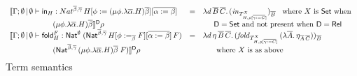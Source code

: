 \documentclass[runningheads]{llncs}
\newcommand{\set}{\mathsf{Set}}
\newcommand{\fold}{\mathsf{fold}}
\begin{document}
\begin{figure}[t]
\begin{adjustbox}{varwidth=6in, max width=5.3in, fbox, center}
\[\begin{array}{lll}
\llbracket \Gamma;\emptyset \,|\, \emptyset \vdash \tin_H :
Nat^{\ol{\beta},\ol{\gamma}} \, H[\phi := (\mu \phi.\lambda {\overline
    \alpha}.H){\overline \beta}][\ol{\alpha := \beta}] & = &
\lambda d\,\ol{B}\,
\ol{C}.\,(\mathit{in}_{{T}^X_{H,\rho[\ol{\gamma :=
        C}]}})_{\ol{B}} \;\;\mbox{ where } X \mbox{ is } \set \mbox{ when } \\ 
\hspace*{0.79in}(\mu \phi.\lambda {\overline \alpha}.H){\overline
  \beta} \rrbracket^{\mathsf{D}} \rho & & \hspace*{0.2in}  
\mathsf{D} = \set \mbox{ and not present when }
\mathsf{D} = \rel\\  
\llbracket \Gamma;\emptyset \,|\, \emptyset \vdash
  \fold^F_H : \Nat^\emptyset\;(\Nat^{\ol{\beta}, \ol{\gamma}}\,H[\phi
    :=_{\ol{\beta}} F][\ol{\alpha := \beta}]\,F) & = &  
\lambda d\,\eta\,\ol{B}\,\ol{C}.\,
(\mathit{fold}_{T^X_{H,\rho[\ol{\gamma := C}]}} \, (\lambda
\ol{A}.\,\eta_{\ol{A}\,\ol{C}}))_{\ol{B}}\\ 
\hspace*{0.79in}(\Nat^{{\ol{\beta},\ol{\gamma}} }\,(\mu
  \phi.\lambda \overline \alpha.H)\overline \beta\;F)
\rrbracket^{\mathsf{D}} \rho & & \hspace*{0.2in} \mbox{ where } X \mbox{ is as above
}\vspace*{-0.1in} 
\end{array}\]
\caption{Term semantics}\label{fig:term-sem} 
\vspace*{-0.05in}
\end{adjustbox}
\end{figure}

\end{document}
